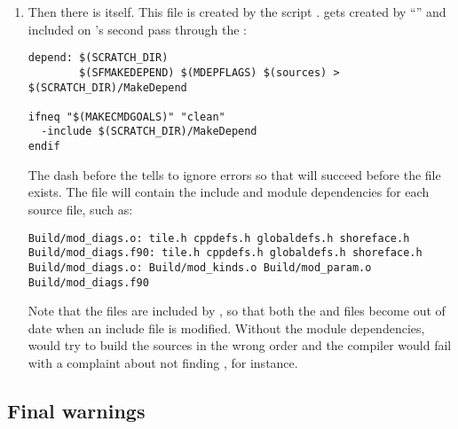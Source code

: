 \begin{enumerate}
\item Then there is  itself. This file is created
by the  script . 
gets created by ``'' and included on 's
second pass through the :
\begin{verbatim}
depend: $(SCRATCH_DIR)
        $(SFMAKEDEPEND) $(MDEPFLAGS) $(sources) > $(SCRATCH_DIR)/MakeDepend 

ifneq "$(MAKECMDGOALS)" "clean"
  -include $(SCRATCH_DIR)/MakeDepend
endif
\end{verbatim}
The dash before the  tells  to ignore
errors so that  will succeed before the file
exists. The  file will contain the include and
module dependencies for each source file, such as:
\begin{verbatim}
Build/mod_diags.o: tile.h cppdefs.h globaldefs.h shoreface.h
Build/mod_diags.f90: tile.h cppdefs.h globaldefs.h shoreface.h
Build/mod_diags.o: Build/mod_kinds.o Build/mod_param.o Build/mod_diags.f90
\end{verbatim}
Note that the  files are included by , so that
both the  and  files become out of date when an
include file is modified. Without the module dependencies,
 would try to build the sources in the wrong order and
the compiler would fail with a complaint about not finding
, for instance.
\end{enumerate}

\subsection{Final warnings}

